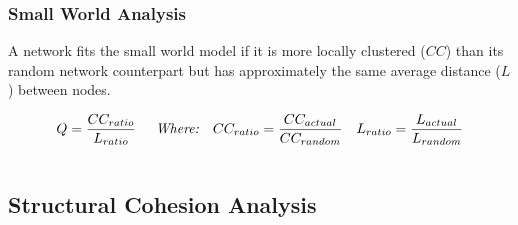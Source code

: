 \documentclass[ignorenonframetext,red,8pt,notes=show]{beamer}
\begin{document}
\begin{frame}
\frametitle{Small World Analysis}

A network fits the small world model if it is more locally clustered ($CC$) than its random network counterpart but has approximately the same average distance ($L$) between nodes. 

\begin{align}
Q = \frac{CC_{ratio}}{L_{ratio}} & \hspace{0.5cm} \textit{Where:} & 
CC_{ratio}& = \frac{CC_{actual}}{CC_{random}} &
L_{ratio}& = \frac{L_{actual}}{L_{random}} \nonumber \\
\end{align}



\begin{columns}[c]
\begin{column}{0.5\textwidth}

\end{column}

\begin{column}{0.5\textwidth}

\end{column}
\end{columns}

\end{frame}




\subsection{Structural Cohesion Analysis}
\end{document}
